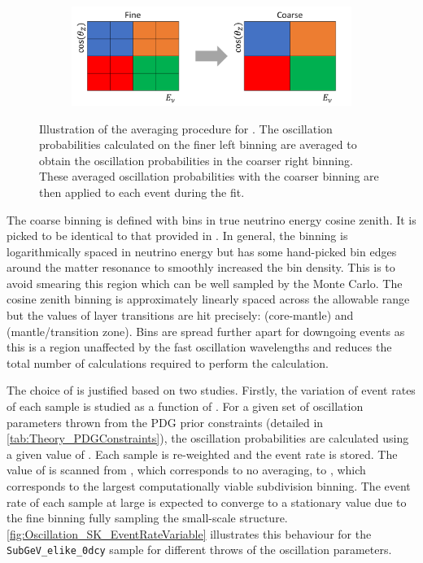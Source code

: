 \begin{figure}[h]
  \begin{subfigure}[t]{\textwidth}
    \includegraphics[width=\textwidth, trim={0mm 0mm 0mm 0mm}, clip,page=1]{Figures/Oscillation/SubSamplingExample.pdf}
  \end{subfigure}
  \caption{Illustration of the averaging procedure for . The oscillation probabilities calculated on the finer left binning are averaged to obtain the oscillation probabilities in the coarser right binning. These averaged oscillation probabilities with the coarser binning are then applied to each event during the fit.}
  \label{fig:Oscillation_SK_SubSamplingExample}
\end{figure}

The coarse binning is defined with  bins in true neutrino energy \quickmath{\times} cosine zenith. It is picked to be identical to that provided in \cite{t2k_tn_425}. In general, the binning is logarithmically spaced in neutrino energy but has some hand-picked bin edges around the matter resonance to smoothly increased the bin density. This is to avoid smearing this region which can be well sampled by the Monte Carlo. The cosine zenith binning is approximately linearly spaced across the allowable range but the values of layer transitions are hit precisely:  (core-mantle) and  (mantle/transition zone). Bins are spread further apart for downgoing events as this is a region unaffected by the fast oscillation wavelengths and reduces the total number of calculations required to perform the calculation.

The choice of  is justified based on two studies. Firstly, the variation of event rates of each sample is studied as a function of . For a given set of oscillation parameters thrown from the PDG prior constraints (detailed in \autoref{tab:Theory_PDGConstraints}), the oscillation probabilities are calculated using a given value of . Each sample is re-weighted and the event rate is stored. The value of  is scanned from , which corresponds to no averaging, to , which corresponds to the largest computationally viable subdivision binning. The event rate of each sample at large  is expected to converge to a stationary value due to the fine binning fully sampling the small-scale structure. \autoref{fig:Oscillation_SK_EventRateVariable} illustrates this behaviour for the \texttt{SubGeV\_elike\_0dcy} sample for  different throws of the oscillation parameters.

